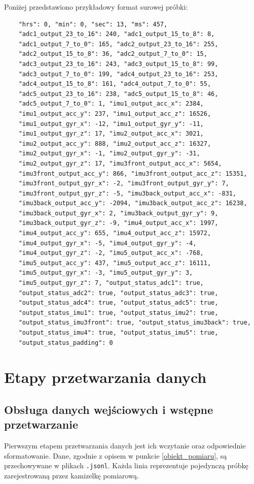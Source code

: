 Poniżej przedstawiono przykładowy format surowej próbki:

\begin{verbatim}
    "hrs": 0, "min": 0, "sec": 13, "ms": 457,
    "adc1_output_23_to_16": 240, "adc1_output_15_to_8": 8,
    "adc1_output_7_to_0": 165, "adc2_output_23_to_16": 255,
    "adc2_output_15_to_8": 36, "adc2_output_7_to_0": 15,
    "adc3_output_23_to_16": 243, "adc3_output_15_to_8": 99,
    "adc3_output_7_to_0": 199, "adc4_output_23_to_16": 253,
    "adc4_output_15_to_8": 161, "adc4_output_7_to_0": 55,
    "adc5_output_23_to_16": 238, "adc5_output_15_to_8": 46,
    "adc5_output_7_to_0": 1, "imu1_output_acc_x": 2384,
    "imu1_output_acc_y": 237, "imu1_output_acc_z": 16526,
    "imu1_output_gyr_x": -12, "imu1_output_gyr_y": -11,
    "imu1_output_gyr_z": 17, "imu2_output_acc_x": 3021,
    "imu2_output_acc_y": 888, "imu2_output_acc_z": 16327,
    "imu2_output_gyr_x": -1, "imu2_output_gyr_y": -31,
    "imu2_output_gyr_z": 17, "imu3front_output_acc_x": 5654,
    "imu3front_output_acc_y": 866, "imu3front_output_acc_z": 15351,
    "imu3front_output_gyr_x": -2, "imu3front_output_gyr_y": 7,
    "imu3front_output_gyr_z": -5, "imu3back_output_acc_x": -831,
    "imu3back_output_acc_y": -2094, "imu3back_output_acc_z": 16238,
    "imu3back_output_gyr_x": 2, "imu3back_output_gyr_y": 9,
    "imu3back_output_gyr_z": -9, "imu4_output_acc_x": 1997,
    "imu4_output_acc_y": 655, "imu4_output_acc_z": 15972,
    "imu4_output_gyr_x": -5, "imu4_output_gyr_y": -4,
    "imu4_output_gyr_z": -2, "imu5_output_acc_x": -768,
    "imu5_output_acc_y": 437, "imu5_output_acc_z": 16111,
    "imu5_output_gyr_x": -3, "imu5_output_gyr_y": 3,
    "imu5_output_gyr_z": 7, "output_status_adc1": true,
    "output_status_adc2": true, "output_status_adc3": true,
    "output_status_adc4": true, "output_status_adc5": true,
    "output_status_imu1": true, "output_status_imu2": true,
    "output_status_imu3front": true, "output_status_imu3back": true,
    "output_status_imu4": true, "output_status_imu5": true,
    "output_status_padding": 0
\end{verbatim}

\section{Etapy przetwarzania danych}
\subsection{Obsługa danych wejściowych i wstępne przetwarzanie}
\label{clean_data}
Pierwszym etapem przetwarzania danych jest ich wczytanie oraz odpowiednie
sformatowanie. Dane, zgodnie z opisem w punkcie \ref{obiekt_pomiaru}, są przechowywane w 
plikach \texttt{.jsonl}. Każda linia reprezentuje pojedynczą próbkę zarejestrowaną
przez kamizelkę pomiarową.

